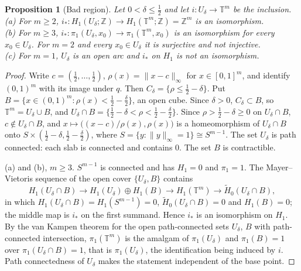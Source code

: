 \documentclass[11pt]{article}
\newtheorem{proposition}[theorem]{Proposition}
\theoremstyle{remark}
\newcommand{\norm}[1]{\lVert #1\rVert}
\newcommand{\Z}{\mathbb{Z}}
\begin{document}
\begin{proposition}[Bad region]\label{prop:bad}
Let $0<\delta\le\frac12$ and let $i:U_\delta\to\mathbb T^m$ be the inclusion.\\
(a) For $m\ge2$, $i_*:H_1(U_\delta;\Z)\to H_1(\mathbb T^m;\Z)=\Z^m$ is an isomorphism.\\
(b) For $m\ge3$, $i_*:\pi_1(U_\delta,x_0)\to\pi_1(\mathbb T^m,x_0)$ is an isomorphism for every $x_0\in U_\delta$. For $m=2$ and every $x_0\in U_\delta$ it is surjective and not injective.\\
(c) For $m=1$, $U_\delta$ is an open arc and $i_*$ on $H_1$ is not an isomorphism.
\end{proposition}
\begin{proof}
Write $c=(\frac12,\dots,\frac12)$, $\rho(x)=\norm{x-c}_\infty$ for $x\in[0,1]^m$, and identify $(0,1)^m$ with its image under $q$. Then $C_\delta=\{\rho\le\frac12-\delta\}$. Put $B=\{x\in(0,1)^m:\rho(x)<\frac12-\frac\delta2\}$, an open cube. Since $\delta>0$, $C_\delta\subset B$, so $\mathbb T^m=U_\delta\cup B$, and $U_\delta\cap B=\{\frac12-\delta<\rho<\frac12-\frac\delta2\}$. Since $\rho>\frac12-\delta\ge0$ on $U_\delta\cap B$, $c\notin U_\delta\cap B$, and $x\mapsto\bigl((x-c)/\rho(x),\rho(x)\bigr)$ is a homeomorphism of $U_\delta\cap B$ onto $S\times(\frac12-\delta,\frac12-\frac\delta2)$, where $S=\{y:\norm{y}_\infty=1\}\cong S^{m-1}$. The set $U_\delta$ is path connected: each slab is connected and contains $0$. The set $B$ is contractible.

(a) and (b), $m\ge3$. $S^{m-1}$ is connected and has $H_1=0$ and $\pi_1=1$. The Mayer--Vietoris sequence of the open cover $\{U_\delta,B\}$ contains
\[H_1(U_\delta\cap B)\to H_1(U_\delta)\oplus H_1(B)\to H_1(\mathbb T^m)\to\widetilde H_0(U_\delta\cap B),\]
in which $H_1(U_\delta\cap B)=H_1(S^{m-1})=0$, $\widetilde H_0(U_\delta\cap B)=0$ and $H_1(B)=0$; the middle map is $i_*$ on the first summand. Hence $i_*$ is an isomorphism on $H_1$. By the van Kampen theorem for the open path-connected sets $U_\delta$, $B$ with path-connected intersection, $\pi_1(\mathbb T^m)$ is the amalgam of $\pi_1(U_\delta)$ and $\pi_1(B)=1$ over $\pi_1(U_\delta\cap B)=1$, that is $\pi_1(U_\delta)$, the identification being induced by $i$. Path connectedness of $U_\delta$ makes the statement independent of the base point.


\end{proof}
\end{document}
